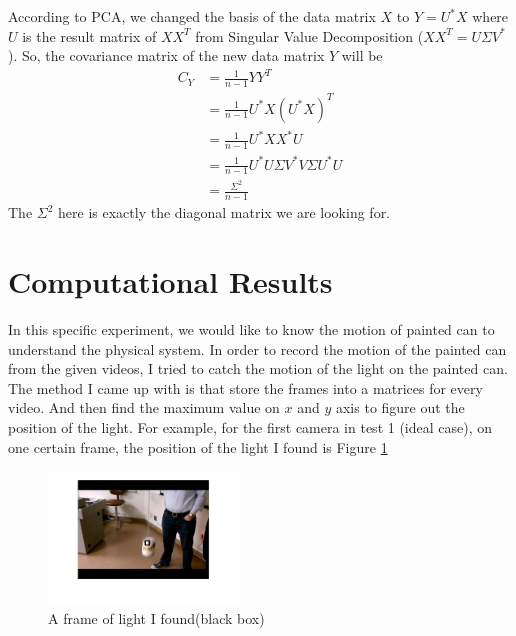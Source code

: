 \documentclass[twoside,twocolumn]{article}
\begin{document}
    According to PCA, we changed the basis of the data matrix $X$ to $Y = U^* X$ where $U$ is the result matrix 
    of $XX^T$ from Singular Value Decomposition ($XX^T = U\Sigma V^*$). So, the covariance matrix of the new data matrix $Y$
    will be 
    \begin{align*}
        C_Y &= \frac{1}{n - 1} YY^T \\
            &= \frac{1}{n - 1} U^* X(U^* X)^T \\
            &= \frac{1}{n - 1} U^* X X^* U \\
            &= \frac{1}{n - 1} U^* U \Sigma V^* V \Sigma U^* U \\
            &= \frac{\Sigma^2}{n - 1}
    \end{align*} 
    The $\Sigma^2$ here is exactly the diagonal matrix we are looking for.

    \section{Computational Results}
    In this specific experiment, we would like to know the motion of painted can to understand the physical system.
    In order to record the motion of the painted can from the given videos, I tried to catch the motion of the light
    on the painted can. The method I came up with is that store the frames into a matrices for every video. And then
    find the maximum value on $x$ and $y$ axis to figure out the position of the light. For example, for the first
    camera in test 1 (ideal case), on one certain frame, the position of the light I found is Figure \ref{fig:example}
    \begin{figure}[h]
        \includegraphics[width = 0.45\textwidth]{1example.jpg}
        \caption{A frame of light I found(black box)}
        \label{fig:example}
    \end{figure}
\end{document}
